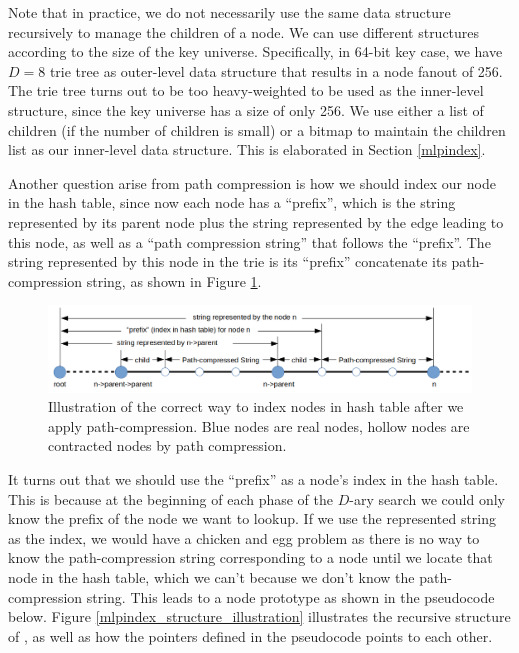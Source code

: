 \documentclass[11pt, usletter]{article}
\begin{document}
Note that in practice, we do not necessarily use the same data structure recursively to manage the children of a node. 
We can use different structures according to the size of the key universe. 
Specifically, in 64-bit key case, we have $D=8$ trie tree as outer-level data structure 
that results in a node fanout of 256. 
The trie tree turns out to be too heavy-weighted to be used as the inner-level structure, 
since the key universe has a size of only 256.
We use either a list of children (if the number of children is small) 
or a bitmap to maintain the children list as our inner-level data structure. 
This is elaborated in Section \ref{mlpindex}.
 
Another question arise from path compression is how we should index our node in the hash table, 
since now each node has a ``prefix'', which is the string represented by its parent node 
plus the string represented by the edge leading to this node, 
as well as a ``path compression string'' that follows the ``prefix''. 
The string represented by this node in the trie is its ``prefix'' concatenate its path-compression string, 
as shown in Figure \ref{mlpindex_node}.

\begin{figure}[!htb]
  \includegraphics[width=\linewidth]{mlpindex_node.png}
\caption{Illustration of the correct way to index nodes in hash table after we apply path-compression.
Blue nodes are real nodes, hollow nodes are contracted nodes by path compression.}
\label{mlpindex_node}
\end{figure}

It turns out that we should use the ``prefix'' as a node's index 
in the hash table. This is because at the beginning of each phase of the $D$-ary search
we could only know the prefix of the node we want to lookup. 
If we use the represented string as the index, we would have a chicken and egg problem as 
there is no way to know the path-compression string corresponding to a node
until we locate that node in the hash table, which we can't because we don't know the path-compression string. 
This leads to a node prototype as shown in the pseudocode below.
Figure \ref{mlpindex_structure_illustration} illustrates the recursive structure of \MlpIndex, 
as well as how the pointers defined in the pseudocode points to each other.
\end{document}

